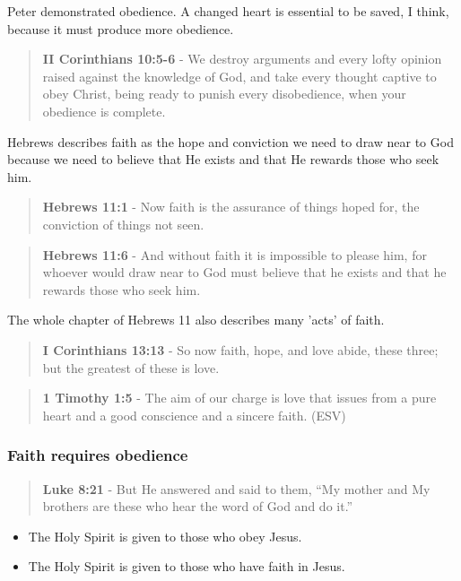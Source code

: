 \documentclass[11pt]{article}
\begin{document}
Peter demonstrated obedience. A changed heart is essential to be saved, I think, because it must produce more obedience.

\begin{quote}
\textbf{II Corinthians 10:5-6} - We destroy arguments and every lofty opinion raised against the knowledge of God, and take every thought captive to obey Christ, being ready to punish every disobedience, when your obedience is complete.
\end{quote}

Hebrews describes faith as the hope and conviction we need to draw near to God because we need to believe that He exists and that He rewards those who seek him.

\begin{quote}
\textbf{Hebrews 11:1} - Now faith is the assurance of things hoped for, the conviction of things not seen.
\end{quote}

\begin{quote}
\textbf{Hebrews 11:6} - And without faith it is impossible to please him, for whoever would draw near to God must believe that he exists and that he rewards those who seek him.
\end{quote}

The whole chapter of Hebrews 11 also describes many 'acts' of faith.

\begin{quote}
\textbf{I Corinthians 13:13} - So now faith, hope, and love abide, these three; but the greatest of these is love.
\end{quote}

\begin{quote}
\textbf{1 Timothy 1:5} -  The aim of our charge is love that issues from a pure heart and a good conscience and a sincere faith.  (ESV)
\end{quote}

\subsubsection{Faith requires obedience}
\label{sec:org9340746}
\begin{quote}
\textbf{Luke 8:21} - But He answered and said to them, “My mother and My brothers are these who hear the word of God and do it.”
\end{quote}

\begin{itemize}
\item The Holy Spirit is given to those who obey Jesus.
\item The Holy Spirit is given to those who have faith in Jesus.
\end{itemize}
\end{document}
